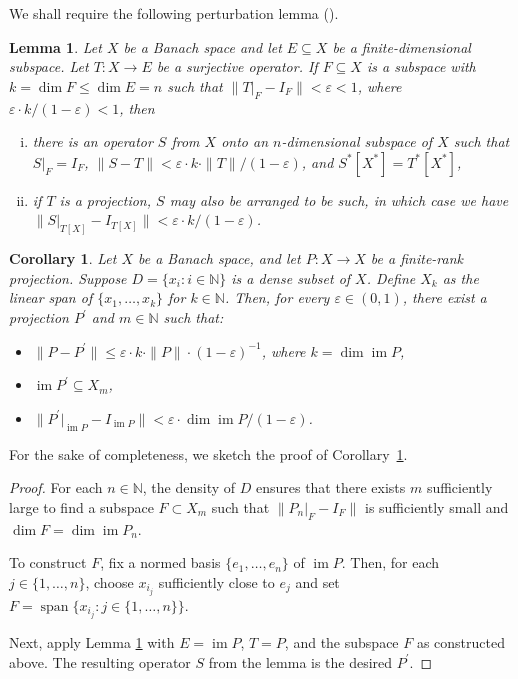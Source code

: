 \documentclass[12pt,fleqn]{amsart}
\renewcommand{\leq}{\leqslant}
\newtheorem{lemma}[theorem]{Lemma}
\newtheorem{corollary}[theorem]{Corollary}
\theoremstyle{definition}
\theoremstyle{remark}
\begin{document}
We shall require the following perturbation lemma (\cite[Lemma 2.4]{JRZ}).
%
\begin{lemma}\label{L:pert}
    Let $X$ be a Banach space and let $E\subseteq X$ be a finite-dimensional subspace. Let $T\colon X\to E$ be a surjective operator. If $F\subseteq X$ is a subspace with $k = \dim F \leqslant \dim E = n$ such that $\|T|_F - I_F\| < \varepsilon < 1$, where $\varepsilon\cdot k / (1-\varepsilon) < 1$, then
    \begin{enumerate}[i)]
        \item there is an operator $S$ from $X$ onto an $n$-dimensional subspace of $X$ such that $S|_F = I_F$, $\|S-T\| < \varepsilon\cdot k\cdot \|T\| / (1-\varepsilon) $, and $S^*[X^*] = T^*[X^*]$,
        \item if $T$ is a projection, $S$ may also be arranged to be such, in which case we have $\|S|_{T[X]} - I_{T[X]}\| < \varepsilon\cdot k / (1-\varepsilon)$.
    \end{enumerate}
\end{lemma}
%
\begin{corollary}\label{C:O poprawie operatorow}
Let \( X \) be a Banach space, and let \( P \colon X \to X \) be a finite-rank projection. Suppose \( D = \{x_i \colon i \in \mathbb{N}\} \) is a dense subset of \( X \). Define \( X_k \) as the linear span of \( \{x_1, \ldots, x_k\} \) for \( k \in \mathbb{N} \). Then, for every \( \varepsilon \in (0, 1) \), there exist a projection \( P^\prime \) and \( m \in \mathbb{N} \) such that:
\begin{itemize}
    \item \( \|P - P^\prime\| \leq \varepsilon \cdot k \cdot \|P\| \cdot (1 - \varepsilon)^{-1} \), where \( k = \dim \operatorname{im} P \),
    \item \( \operatorname{im} P^\prime \subseteq X_m \),
    \item \( \|P^\prime|_{\operatorname{im} P} - I_{\operatorname{im} P}\| < \varepsilon \cdot \dim \operatorname{im} P / (1 - \varepsilon) \).
\end{itemize}
\end{corollary}
For the sake of completeness, we sketch the proof of Corollary~\ref{C:O poprawie operatorow}.
\begin{proof}
     For each \( n \in \mathbb{N} \), the density of \( D \) ensures that there exists \( m \) sufficiently large to find a subspace \( F \subset X_m \) such that \( \|P_n|_F - I_F\| \) is sufficiently small and \( \dim F = \dim \operatorname{im} P_n \). 
    
    To construct \( F \), fix a normed basis \( \{e_1, \ldots, e_n\} \) of \( \operatorname{im} P \). Then, for each \( j \in \{1, \ldots, n\} \), choose \( x_{i_j} \) sufficiently close to \( e_j \) and set \( F = \operatorname{span}\{x_{i_j} : j \in \{1, \ldots, n\}\} \). 
    
    Next, apply Lemma \ref{L:pert} with \( E = \operatorname{im} P \), \( T = P \), and the subspace \( F \) as constructed above. The resulting operator \( S \) from the lemma is the desired \( P^\prime \).
\end{proof}
\end{document}
